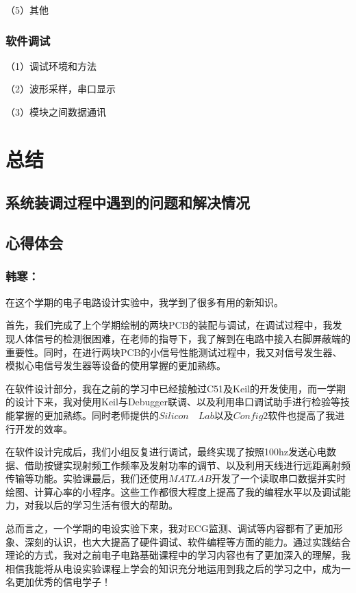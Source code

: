 \documentclass{zjureport}
\begin{document}
	（5）其他
	
	
	\subsubsection{软件调试}
	
	（1）调试环境和方法
	
	（2）波形采样，串口显示   
	
	（3）模块之间数据通讯      
	
	\section{总结}
	
	\subsection{系统装调过程中遇到的问题和解决情况}
	
	\subsection{心得体会}
	
	\subsubsection{韩寒：}
	
	在这个学期的电子电路设计实验中，我学到了很多有用的新知识。
	
	首先，我们完成了上个学期绘制的两块PCB的装配与调试，在调试过程中，我发现人体信号的检测很困难，在老师的指导下，我了解到在电路中接入右脚屏蔽端的重要性。同时，在进行两块PCB的小信号性能测试过程中，我又对信号发生器、模拟心电信号发生器等设备的使用掌握的更加熟练。
	
	在软件设计部分，我在之前的学习中已经接触过C51及Keil的开发使用，而一学期的设计下来，我对使用Keil与Debugger联调、以及利用串口调试助手进行检验等技能掌握的更加熟练。同时老师提供的$Silicon \quad Lab$以及$Config2$软件也提高了我进行开发的效率。
	
	在软件设计完成后，我们小组反复进行调试，最终实现了按照100hz发送心电数据、借助按键实现射频工作频率及发射功率的调节、以及利用天线进行远距离射频传输等功能。实验课最后，我们还使用$MATLAB$开发了一个读取串口数据并实时绘图、计算心率的小程序。这些工作都很大程度上提高了我的编程水平以及调试能力，对我以后的学习生活有很大的帮助。
	
	总而言之，一个学期的电设实验下来，我对ECG监测、调试等内容都有了更加形象、深刻的认识，也大大提高了硬件调试、软件编程等方面的能力。通过实践结合理论的方式，我对之前电子电路基础课程中的学习内容也有了更加深入的理解，我相信我能将从电设实验课程上学会的知识充分地运用到我之后的学习之中，成为一名更加优秀的信电学子！
	
\end{document}
